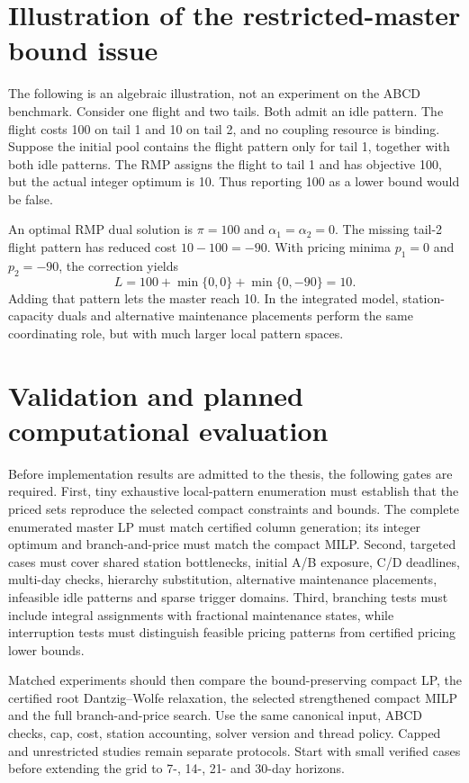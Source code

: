 \section{Illustration of the restricted-master bound issue}
\label{sec:bp_example}

The following is an algebraic illustration, not an experiment on the ABCD
benchmark. Consider one flight and two tails. Both admit an idle pattern.
The flight costs 100 on tail 1 and 10 on tail 2, and no coupling resource is
binding. Suppose the initial pool contains the flight pattern only for tail 1,
together with both idle patterns. The RMP assigns the flight to tail 1 and
has objective 100, but the actual integer optimum is 10. Thus reporting 100
as a lower bound would be false.

An optimal RMP dual solution is $\pi=100$ and $\alpha_1=\alpha_2=0$.
The missing tail-2 flight pattern has reduced cost $10-100=-90$.
With pricing minima $p_1=0$ and $p_2=-90$, the correction yields
\begin{equation}
 L=100+\min\{0,0\}+\min\{0,-90\}=10.
\end{equation}
Adding that pattern lets the master reach 10. In the integrated model,
station-capacity duals and alternative maintenance placements perform the
same coordinating role, but with much larger local pattern spaces.

\section{Validation and planned computational evaluation}
\label{sec:bp_evaluation}

Before implementation results are admitted to the thesis, the following gates
are required. First, tiny exhaustive local-pattern enumeration must establish
that the priced sets reproduce the selected compact constraints and bounds.
The complete enumerated master LP must match certified column generation;
its integer optimum and branch-and-price must match the compact MILP.
Second, targeted cases must cover shared station bottlenecks, initial A/B
exposure, C/D deadlines, multi-day checks, hierarchy substitution, alternative
maintenance placements, infeasible idle patterns and sparse trigger domains.
Third, branching tests must include integral assignments with fractional
maintenance states, while interruption tests must distinguish feasible pricing
patterns from certified pricing lower bounds.

Matched experiments should then compare the bound-preserving compact LP,
the certified root Dantzig--Wolfe relaxation, the selected strengthened compact
MILP and the full branch-and-price search. Use the same canonical input,
ABCD checks, cap, cost, station accounting, solver version and thread policy.
Capped and unrestricted studies remain separate protocols. Start with small
verified cases before extending the grid to 7-, 14-, 21- and 30-day horizons.

